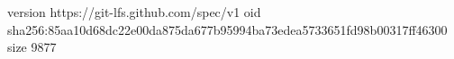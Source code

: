 version https://git-lfs.github.com/spec/v1
oid sha256:85aa10d68dc22e00da875da677b95994ba73edea5733651fd98b00317ff46300
size 9877
